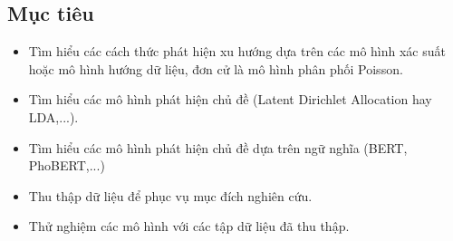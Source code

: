 \subsection{Mục tiêu}
\begin{itemize}
	\item Tìm hiểu các cách thức phát hiện xu hướng dựa trên các mô hình xác
		suất hoặc mô hình hướng dữ liệu, đơn cử là mô hình phân phối Poisson.

	\item Tìm hiểu các mô hình phát hiện chủ đề (Latent Dirichlet Allocation
		hay LDA,...).

	\item Tìm hiểu các mô hình phát hiện chủ đề dựa trên ngữ nghĩa (BERT,
		PhoBERT,...)
	
	\item Thu thập dữ liệu để phục vụ mục đích nghiên cứu.
	
	\item Thử nghiệm các mô hình với các tập dữ liệu đã thu thập.
\end{itemize}
